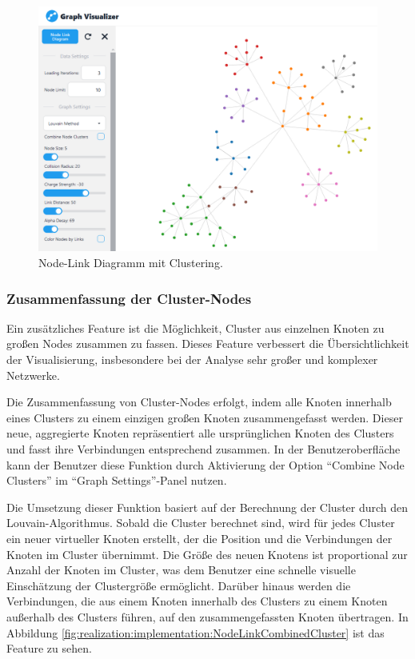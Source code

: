 \begin{figure}[h]
    \centering
    \includegraphics[height=.5\textwidth]{images/03/ClusteringView.png}
    \caption{Node-Link Diagramm mit Clustering.}
    \label{fig:realization:implementation:NodeLinkCluster}
\end{figure}

\subsubsection{Zusammenfassung der Cluster-Nodes}

Ein zusätzliches Feature ist die Möglichkeit, Cluster aus einzelnen Knoten zu großen Nodes zusammen zu fassen. Dieses Feature verbessert die Übersichtlichkeit der Visualisierung, insbesondere bei der Analyse sehr großer und komplexer Netzwerke.

Die Zusammenfassung von Cluster-Nodes erfolgt, indem alle Knoten innerhalb eines Clusters zu einem einzigen großen Knoten zusammengefasst werden. Dieser neue, aggregierte Knoten repräsentiert alle ursprünglichen Knoten des Clusters und fasst ihre Verbindungen entsprechend zusammen. In der Benutzeroberfläche kann der Benutzer diese Funktion durch Aktivierung der Option \enquote{Combine Node Clusters} im \enquote{Graph Settings}-Panel nutzen.

Die Umsetzung dieser Funktion basiert auf der Berechnung der Cluster durch den Louvain-Algorithmus. Sobald die Cluster berechnet sind, wird für jedes Cluster ein neuer virtueller Knoten erstellt, der die Position und die Verbindungen der Knoten im Cluster übernimmt. Die Größe des neuen Knotens ist proportional zur Anzahl der Knoten im Cluster, was dem Benutzer eine schnelle visuelle Einschätzung der Clustergröße ermöglicht. Darüber hinaus werden die Verbindungen, die aus einem Knoten innerhalb des Clusters zu einem Knoten außerhalb des Clusters führen, auf den zusammengefassten Knoten übertragen. In Abbildung \ref{fig:realization:implementation:NodeLinkCombinedCluster} ist das Feature zu sehen.

